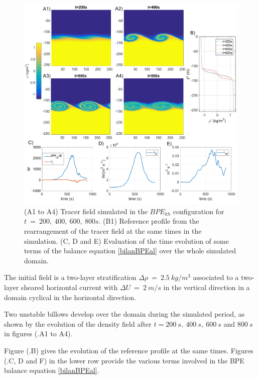 \begin{figure}[h!]
\centering
\includegraphics[width=1\textwidth]{./CHAP_BPE/Fig_KH2.png}
\caption[Tracer field and evaluation of $\kappa_{eff}$ for configuration $BPE_{kh}$]{(A1 to A4) Tracer field simulated in the $BPE_{kh}$ configuration for $t\ = \ 200,\ 400,\ 600,\ 800s$. (B1) Reference profile from the rearrangement of the tracer field at the same times in the simulation. (C, D and E) Evaluation of the time evolution of some terms of the balance equation \ref{bilanBPEal} over the whole simulated domain.}
\label{figCkh}
\end{figure}
The initial field is a two-layer stratification  $\Delta \rho\  =\ 2.5\ kg/m^3$ associated to a two-layer sheared horizontal current with $\Delta U\ =\ 2\ m/s$ in the vertical direction in a domain cyclical in the horizontal direction. 

Two unstable billows develop over the domain during the simulated period, as shown by the evolution of the density field after $t = 200\ s,\ 400\ s,\ 600\ s$ and $800\ s$ in figures (.A1 to A4).

Figure (.B) gives the evolution of the reference profile at the same times. Figures (.C, D and F) in the lower row provide the various terms involved in the BPE balance equation \ref{bilanBPEal}.

